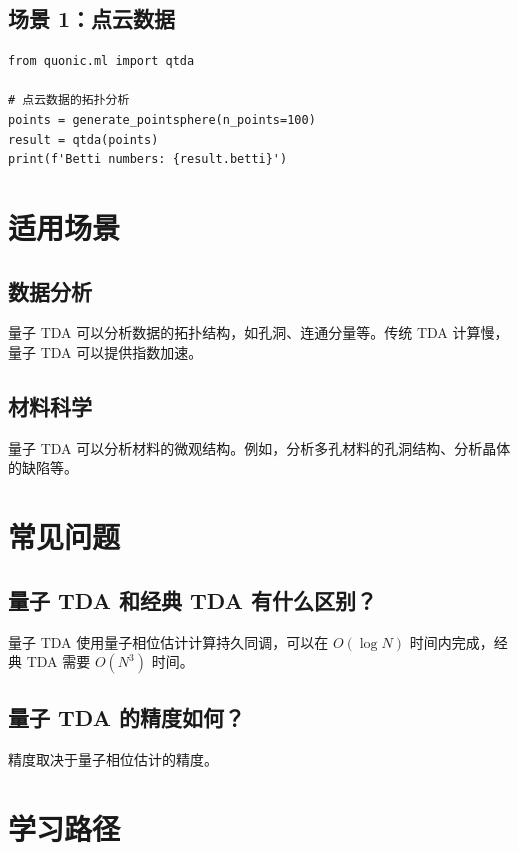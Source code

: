 \documentclass[12pt,a4paper]{article}
\begin{document}
\subsection{场景 1：点云数据}

\begin{verbatim}
from quonic.ml import qtda

# 点云数据的拓扑分析
points = generate_pointsphere(n_points=100)
result = qtda(points)
print(f'Betti numbers: {result.betti}')
\end{verbatim}

\section{适用场景}

\subsection{数据分析}

量子 TDA 可以分析数据的拓扑结构，如孔洞、连通分量等。传统 TDA 计算慢，量子 TDA 可以提供指数加速。

\subsection{材料科学}

量子 TDA 可以分析材料的微观结构。例如，分析多孔材料的孔洞结构、分析晶体的缺陷等。

\section{常见问题}

\subsection{量子 TDA 和经典 TDA 有什么区别？}

量子 TDA 使用量子相位估计计算持久同调，可以在 $O(\log N)$ 时间内完成，经典 TDA 需要 $O(N^3)$ 时间。

\subsection{量子 TDA 的精度如何？}

精度取决于量子相位估计的精度。

\section{学习路径}
\end{document}

